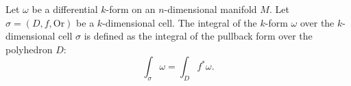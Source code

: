 Let $\omega$ be a differential $k$-form on an $n$-dimensional manifold $M$. Let $\sigma = (D, f, \text{Or})$ be a $k$-dimensional cell. The integral of the $k$-form $\omega$ over the $k$-dimensional cell $\sigma$ is defined as the integral of the pullback form over the polyhedron $D$:
$$\int_{\sigma} \omega = \int_D f^* \omega.$$
